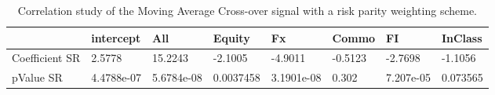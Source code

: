 \begin{table}[H]
\centering
\begin{tabular}{llllllll}
& intercept & All & Equity & Fx & Commo & FI & InClass \\ 
\hline 
Coefficient SR & 2.5778 & 15.2243 & -2.1005 & -4.9011 & -0.5123 & -2.7698 & -1.1056 \\ 
pValue SR & 4.4788e-07 & 5.6784e-08 & 0.0037458 & 3.1901e-08 & 0.302 & 7.207e-05 & 0.073565 \\ 
\hline
\end{tabular}
\caption{Correlation study of the Moving Average Cross-over signal with a risk parity weighting scheme.}
\label{MARP_CORR}
\end{table}